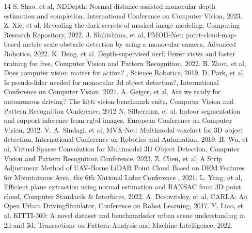 \small
\begin{thebibliography}{14}
    S. Shao, et al, NDDepth: Normal-distance assisted monocular depth estimation and completion, International Conference on Computer Vision, 2023. 
    Z. Xie, et al, Revealing the dark secrets of masked image modeling, Computing Research Repository, 2022.
    J. Shikishima, et al, PMOD-Net: point-cloud-map-based metric scale obstacle detection by using a monocular camera, Advanced Robotics, 2022.
    K. Deng, et al, Depth-supervised nerf: Fewer views and faster training for free, Computer Vision and Pattern Recognition, 2022.
    B. Zhou, et al, Does computer vision matter for action? , Science Robotics, 2019.
    D. Park, et al, Is pseudo-lidar needed for monocular 3d object detection?, International Conference on Computer Vision, 2021.
    A. Geiger, et al, Are we ready for autonomous driving? The kitti vision benchmark suite, Computer Vision and Pattern Recognition Conference, 2012
    N. Silberman, et al, Indoor segmentation and support inference from rgbd images, European Conference on Computer Vision, 2012.
    V. A. Sindagi, et al, MVX-Net: Multimodal voxelnet for 3D object detection, International Conference on Robotics and Automation, 2019.
    H. Wu, et al, Virtual Sparse Convolution for Multimodal 3D Object Detection, Computer Vision and Pattern Recognition Conference, 2023.
    Z. Chen, et al, A Strip Adjustment Method of UAV-Borne LiDAR Point Cloud Based on DEM Features for Mountainous Area, the 6th National Lidar Conference , 2021.
    L. Yang, et al, Efficient plane extraction using normal estimation and RANSAC from 3D point cloud, Computer Standards \& Interfaces, 2022.
    A. Dosovitskiy, et al, CARLA: An Open Urban DrivingSimulator, Conference on Robot Learning, 2017.
    Y. Liao, et al, KITTI-360: A novel dataset and benchmarksfor urban scene understanding in 2d and 3d, Transactions on Pattern Analysis and Machine Intelligence, 2022.
\end{thebibliography}
